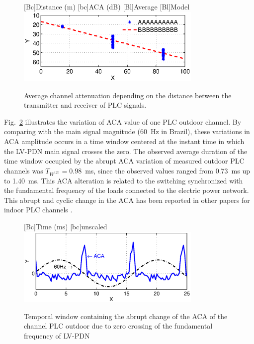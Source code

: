 \documentclass[journal]{IEEEtran}
\newcommand{\tamfig}{3.5in}    %
\begin{document}
\begin{figure}[!htp]
\begin{centering}
   [Bc]{Distance (m)}    
  [bc]{ACA (dB)}
   [Bl]{Average}
   [Bl]{Model}
   \includegraphics[width=\tamfig]{Figuras/ACAxDist.eps}
   \caption{Average channel attenuation depending on the distance between the transmitter and receiver of \ac{PLC} signals.}
   \label{Fig:ACAxDist}
\end{centering}
\end{figure}

Fig.~\ref{Fig:SenoJanelaZero} illustrates the variation of \ac{ACA} value of one \ac{PLC} outdoor channel. By comparing with the main signal magnitude ($60$~Hz in Brazil), these variations in ACA amplitude occurs in a time window centered at the instant time in which the \ac{LV-PDN} main signal crosses the zero. The observed average duration of the time window occupied by the abrupt \ac{ACA} variation of measured outdoor PLC channels was $T_{W^{120}} = 0.98$~ms, since the observed values ranged from 0.73~ms up to 1.40~ms. 
This \ac{ACA} alteration is related to the switching synchronized with the fundamental frequency of the loads connected to the electric power network. This abrupt and cyclic change in the \ac{ACA} has been reported in other papers for indoor \ac{PLC} channels \cite{Corripio2006, Oliveira2017}.

\begin{figure}[!htp]
\begin{centering}
    [Bc]{Time (ms)}    
    [bc]{unscaled}
    \includegraphics[width=\tamfig]{Figuras/SenoJanelaZero.eps}
    \caption{Temporal window containing the abrupt change of the ACA of the channel PLC outdoor due to zero crossing of the fundamental frequency of LV-PDN}
    \label{Fig:SenoJanelaZero}
\end{centering}
\end{figure}
\end{document}
